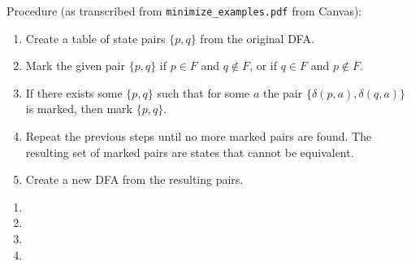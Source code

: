\hrulefill
\begin{center} Procedure (as transcribed from \texttt{minimize\_examples.pdf} from Canvas): \end{center}
\begin{enumerate}[label=\arabic*.]
	\item Create a table of state pairs $\{ p, q \}$ from the original DFA.
	\item Mark the given pair $\{ p, q \}$ if $p \in F$ and $q \notin F$, or if $q \in F$ and $p \notin F$.
	\item If there exists some $\{ p, q \}$ such that for some $a$ the pair $\{ \delta(p,a), \delta(q,a) \}$ is marked, then mark $\{ p, q \}$.
	\item Repeat the previous steps until no more marked pairs are found. The resulting set of marked pairs are states that cannot be equivalent.
	\item Create a new DFA from the resulting pairs.
\end{enumerate}
\hrulefill

\begin{enumerate}
	\item 
	\item 
	\item 
	\item 
\end{enumerate}